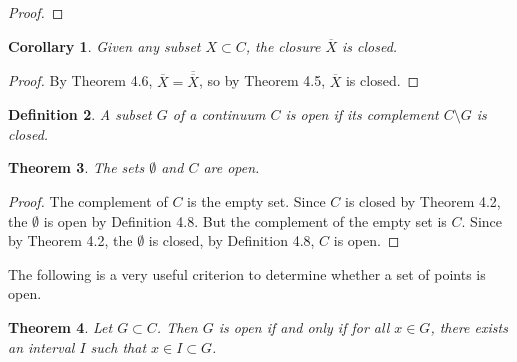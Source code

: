 \documentclass{amsart}
\newtheorem{theorem}{Theorem}
\newtheorem{definition}[theorem]{Definition}
\newtheorem{corollary}[theorem]{Corollary}
\newcommand{\1}{\mathds{1}}
\numberwithin{equation}{section}
\numberwithin{theorem}{section}
\begin{document}
\begin{proof}
\end{proof}

\begin{corollary}  Given any subset $X \subset C$, the closure $\overline{X}$ is closed.
\end{corollary}

\begin{proof}
	By Theorem 4.6, $\overline{X} = \overline{\overline{X}}$, so by Theorem 4.5, $\overline{X}$ is closed.
\end{proof}

\begin{definition}  A subset $G$ of a continuum $C$ is \emph{open} if its complement $C \setminus G$ is closed.
\end{definition}

\begin{theorem}\label{fortop1}  The sets $\emptyset$ and $C$ are open.
\end{theorem}

\begin{proof}
	The complement of $C$ is the empty set. Since $C$ is closed by Theorem 4.2, the $\emptyset$ is open by Definition 4.8. But the complement of the empty set is $C$. Since by Theorem 4.2, the $\emptyset$ is closed, by Definition 4.8, $C$ is open. 
\end{proof}

The following is a very useful criterion to determine whether a set of points is open.

\begin{theorem}  Let $G \subset C$.  Then $G$ is open if and only if for all $x \in G$, there exists an interval $I$ such that $x \in I \subset G$.
\end{theorem}
\end{document}
